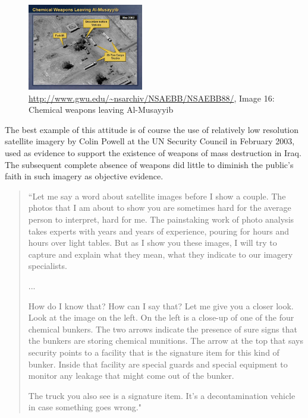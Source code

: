 \documentclass[11pt]{report}
\begin{document}
\begin{figure}
	\begin{flushright}
		\includegraphics[width=0.45\textwidth]{images/iraq-image-16.jpg}
		\caption{\url{http://www.gwu.edu/~nsarchiv/NSAEBB/NSAEBB88/}, Image 16: Chemical weapons leaving Al-Musayyib}
	\end{flushright}
\end{figure}

The best example of this attitude is of course the use of relatively low resolution satellite imagery by Colin Powell at the UN Security Council in February 2003, used as evidence to support the existence of weapons of mass destruction in Iraq. The subsequent complete absence of weapons did little to diminish the public's faith in such imagery as objective evidence. 

\begin{quote}
``Let me say a word about satellite images before I show a couple. The photos that I am about to show you are sometimes hard for the average person to interpret, hard for me. The painstaking work of photo analysis takes experts with years and years of experience, pouring for hours and hours over light tables. But as I show you these images, I will try to capture and explain what they mean, what they indicate to our imagery specialists.

...

How do I know that? How can I say that? Let me give you a closer look. Look at the image on the left. On the left is a close-up of one of the four chemical bunkers. The two arrows indicate the presence of sure signs that the bunkers are storing chemical munitions. The arrow at the top that says security points to a facility that is the signature item for this kind of bunker. Inside that facility are special guards and special equipment to monitor any leakage that might come out of the bunker.

The truck you also see is a signature item. It's a decontamination vehicle in case something goes wrong."
	\cite{guardian2003powell}
\end{quote}
\end{document}
